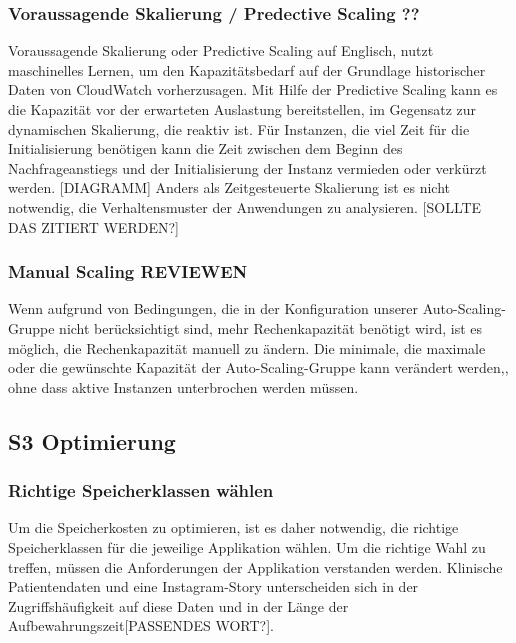 \subsubsection{Voraussagende Skalierung / Predective Scaling ??}
Voraussagende Skalierung oder Predictive Scaling auf Englisch, nutzt maschinelles Lernen, um den Kapazitätsbedarf auf der Grundlage historischer Daten von CloudWatch vorherzusagen. Mit Hilfe der Predictive Scaling kann es die Kapazität vor der erwarteten Auslastung bereitstellen, im Gegensatz zur dynamischen Skalierung, die reaktiv ist. 
Für Instanzen, die viel Zeit für die Initialisierung benötigen kann die Zeit zwischen dem Beginn des Nachfrageanstiegs und der Initialisierung der Instanz vermieden oder verkürzt werden.
[DIAGRAMM]
Anders als Zeitgesteuerte Skalierung ist es nicht notwendig, die Verhaltensmuster der Anwendungen zu analysieren.
[SOLLTE DAS ZITIERT WERDEN?]

\subsubsection{ Manual Scaling REVIEWEN}
Wenn aufgrund von Bedingungen, die in der Konfiguration unserer Auto-Scaling-Gruppe nicht berücksichtigt sind, mehr Rechenkapazität benötigt wird, ist es möglich, die Rechenkapazität manuell zu ändern. Die minimale, die maximale oder die gewünschte Kapazität der Auto-Scaling-Gruppe kann verändert werden,, ohne dass aktive Instanzen unterbrochen werden müssen.








\subsection{S3 Optimierung}

\subsubsection{Richtige Speicherklassen wählen}
Um die Speicherkosten zu optimieren, ist es daher notwendig, die richtige Speicherklassen für die jeweilige Applikation wählen. Um die richtige Wahl zu treffen, müssen die Anforderungen der Applikation verstanden werden. Klinische Patientendaten und eine Instagram-Story unterscheiden sich in der Zugriffshäufigkeit auf diese Daten und in der Länge der Aufbewahrungszeit[PASSENDES WORT?].

